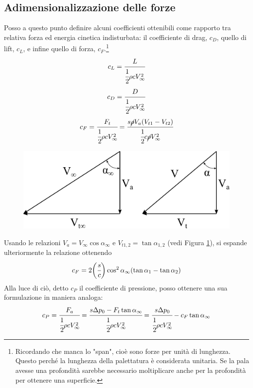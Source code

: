 \subsection{Adimensionalizzazione delle forze}
Posso a questo punto definire alcuni coefficienti ottenibili come rapporto tra relativa forza ed energia cinetica indisturbata: il coefficiente di drag, $c_D$, quello di lift, $c_L$, e infine quello di forza, $c_F$.\footnote{Ricordando che manca lo "span", cioè sono forze per unità di lunghezza. Questo perché la lunghezza della palettatura è considerata unitaria. Se la pala avesse una profondità sarebbe necessario moltiplicare anche per la profondità per ottenere una superficie.}
\begin{align*}
c_L = \cfrac{L}{\cfrac{1}{2} \rho c V_{\infty}^2}
\end{align*}
\begin{align*}
c_D = \cfrac{D}{\cfrac{1}{2} \rho c V_{\infty}^2}
\end{align*}
\begin{align*}
c_F = \cfrac{F_t}{\cfrac{1}{2} \rho c V_{\infty}^2} = \cfrac{s \cancel{\rho} V_a (V_{t1}-V_{t2})}{\cfrac{1}{2} c \cancel{\rho} V_{\infty}^2}
\end{align*}
\begin{figure}
\centering
  \includegraphics[width=.6\textwidth]{fig/trigrel.pdf}
\caption{}
\label{fig:trigrel}
\end{figure}
Usando le relazioni $V_a = V_{\infty} \cos \alpha_{\infty}$ e $V_{t1,2} = \tan \alpha_{1,2}$ (vedi Figura \ref{fig:trigrel}), si espande ulteriormente la relazione ottenendo
\begin{equation}
c_F = 2 \bigg(\cfrac{s}{c} \bigg) \cos ^ 2 \alpha_{\infty}(\tan \alpha_1 - \tan \alpha_2)
\end{equation}
Alla luce di ciò, detto $c_P$ il coefficiente di pressione, posso ottenere una sua formulazione in maniera analoga:
\begin{align*}
c_P = \cfrac{F_a}{\cfrac{1}{2} \rho c V_{\infty}^2} = \cfrac{s \Delta p_0 - F_t \tan \alpha_{\infty}}{\cfrac{1}{2} \rho c V_{\infty}^2} = \cfrac{s \Delta p_0}{\cfrac{1}{2} \rho c V_{\infty}^2} - c_F \tan \alpha_{\infty}
\end{align*}
